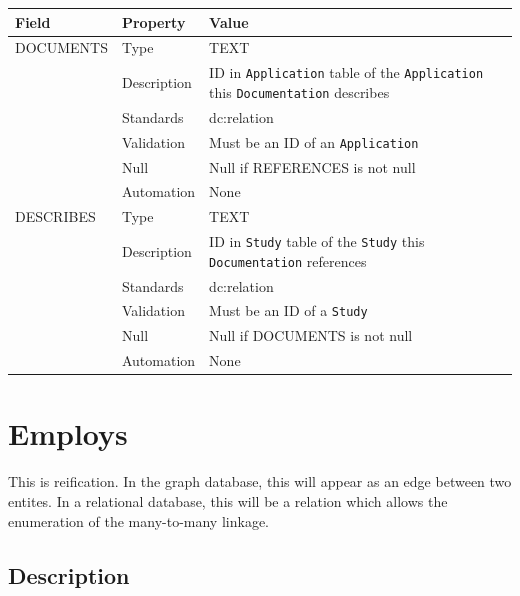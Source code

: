 \documentclass[
]{article}
\newcounter{none}
\begin{document}
{\def\LTcaptype{none} 
\begin{longtable}[]{@{}
  >{\raggedright\arraybackslash}p{}
  >{\raggedright\arraybackslash}p{}
  >{\raggedright\arraybackslash}p{}@{}}
\toprule\noalign{}
\begin{minipage}[b]{\linewidth}\raggedright
Field
\end{minipage} & \begin{minipage}[b]{\linewidth}\raggedright
Property
\end{minipage} & \begin{minipage}[b]{\linewidth}\raggedright
Value
\end{minipage} \\
\midrule\noalign{}
\endhead
\bottomrule\noalign{}
\endlastfoot
DOCUMENTS & Type & TEXT \\
& Description & ID in \texttt{Application} table of the
\texttt{Application} this \texttt{Documentation} describes \\
& Standards & dc:relation \\
& Validation & Must be an ID of an \texttt{Application} \\
& Null & Null if REFERENCES is not null \\
& Automation & None \\
DESCRIBES & Type & TEXT \\
& Description & ID in \texttt{Study} table of the \texttt{Study} this
\texttt{Documentation} references \\
& Standards & dc:relation \\
& Validation & Must be an ID of a \texttt{Study} \\
& Null & Null if DOCUMENTS is not null \\
& Automation & None \\
\end{longtable}
}

\section{Employs}\label{employs}

This is reification. In the graph database, this will appear as an edge
between two entites. In a relational database, this will be a relation
which allows the enumeration of the many-to-many linkage.

\subsection{Description}\label{description-12}
\end{document}
